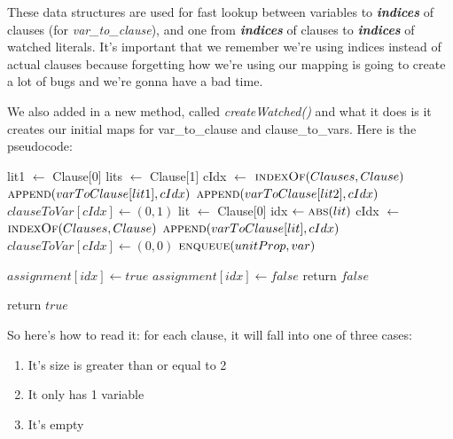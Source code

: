 These data structures are used for fast lookup between variables to  
\textbf{\textit{indices}} of clauses (for \textit{var\_to\_clause}), and 
one from \textbf{\textit{indices}} of clauses to \textbf{\textit{indices}} of 
watched literals. It's important that we remember we're using indices instead 
of actual clauses because forgetting how we're using our mapping is going to create 
a lot of bugs and we're gonna have a bad time. 

We also added in a new method, called \textit{createWatched()} and what it does 
is it creates our initial maps for var\_to\_clause and clause\_to\_vars. 
Here is the pseudocode:

\begin{algorithm}[H]
\caption{Watched Literals Creation}\label{alg:16}
\begin{algorithmic}[1]


        \State lit1 $\gets$ Clause[0]
        \State lits $\gets$ Clause[1]
        \State cIdx $\gets$ $\Call{indexOf}{Clauses, Clause}$
        \State $\Call{append}{varToClause[lit1], cIdx}$
        \State $\Call{append}{varToClause[lit2], cIdx}$
        \State $clauseToVar[cIdx] \gets (0, 1)$
        \State lit $\gets$ Clause[0]
        \State idx $\gets \Call{abs}{lit}$ 
        \State cIdx $\gets$ $\Call{indexOf}{Clauses, Clause}$
        \State $\Call{append}{varToClause[lit], cIdx}$
        \State $clauseToVar[cIdx] \gets (0, 0)$
        \State $\Call{enqueue}{unitProp, var}$

            \State $assignment[idx] \gets true$
        \Else
            \State $assignment[idx] \gets false$
        \EndIf
    \Else
        \State return $false$
    \EndIf
\EndFor

\State return $true$

\EndProcedure
\end{algorithmic}
\end{algorithm}

\noindent So here's how to read it: for each clause, it will fall into one of three cases:
\begin{enumerate}
    \item It's size is greater than or equal to 2
    \item It only has 1 variable
    \item It's empty
\end{enumerate}

